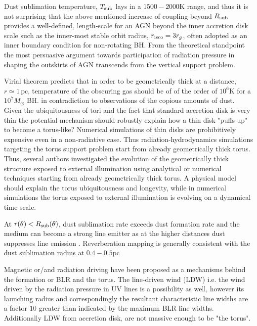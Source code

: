 \documentclass[12pt,english,preprint]{aastex}
\newcommand{\su}[2]{#1_{\rm #2}}
\newcommand{\rsub}{ \su{R}{sub} }
\newcommand{\Tsub}{ \su{T}{sub} }
\begin{document}
Dust sublimation temperature, $\Tsub$ lays in a $1500-2000$K range,
and thus it is not surprising that the above mentioned increase of
coupling beyond $\rsub$ provides a well-defined, length-scale for an
AGN beyond the inner accretion disk scale such as the inner-most
stable orbit radius, $r_{\rm isco}=3r_g$, often adopted as an inner
boundary condition for non-rotating BH. From the theoretical
standpoint the most persuasive argument towards participation of
radiation pressure in shaping the outskirts of AGN transcends from the
vertical support problem.

Virial theorem predicts
that in order to be geometrically thick at a distance, $r\simeq1\,\text{pc}$,  
temperature of the obscuring gas should be of of the order of $10^{6}\text{K}$ for
a $10^{7}M_{\odot}$ BH. in contradiction to observations of the copious amounts of dust. 
Given the ubiquitousness of tori and the fact that standard accretion disk is very thin the potential mechanism should robustly
explain how a thin disk "puffs up" to become a torus-like? 
Numerical simulations of thin disks are prohibitively expensive even in a 
non-radiative case. Thus radiation-hydrodynamics
simulations targeting the torus support problem start from already geometrically thick torus.
Thus, several authors investigated the evolution of the geometrically thick
structure exposed to external illumination using analytical \citep{Krolik07}
or numerical techniques \citep{Dorodnitsyn11a,Dorodnitsyn12a,ChanKrolik16,ChanKrolik17}
starting from already geometrically thick torus. A physical model should explain the torus ubiquitousness and longevity, while
in numerical simulations the torus exposed to external illumination is evolving on a dynamical time-scale.


At $r(\theta)<\rsub(\theta)$, dust sublimation rate exceeds dust formation rate and 
the medium can become a strong line emitter as at the higher distances dust suppresses line 
emission \citep{Netzer93,LaorDraine1993}. Reverberation mapping \citep[i.e.][]{Koshida2014} is generally consistent
with the dust sublimation radius at $0.4-0.5$pc \citep{Kaspi2000}

Magnetic or/and radiation driving have been proposed as a mechanisms behind the formation or BLR and the torus.
The line-driven wind (LDW) i.e. the wind driven by the radiation pressure in UV lines \citep{ProgaKallman2004,Murr05} 
is a possibility as well, however its launching radius and correspondingly the resultant characteristic 
line widths are a factor $10$ greater than indicated by the maximum BLR line widths. Additionally 
LDW from accretion disk, are not massive enough to be "the torus". 
\end{document}
